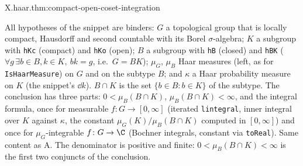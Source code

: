 \begin{tfformal}{X.haar.thm:compact-open-coset-integration}
\begin{tffidelity}
All hypotheses of the snippet are binders: $G$ a topological group that is locally compact, Hausdorff and second countable with its Borel $\sigma$-algebra; $K$ a subgroup with \texttt{hKc} (compact) and \texttt{hKo} (open); $B$ a subgroup with \texttt{hB} (closed) and \texttt{hBK} ($\forall g\,\exists b\in B,k\in K,\ bk=g$, i.e.\ $G=BK$); $\mu_G$, $\mu_B$ Haar measures (left, as for \texttt{IsHaarMeasure}) on $G$ and on the subtype $B$; and $\kappa$ a Haar probability measure on $K$ (the snippet's $\dd k$). $B\cap K$ is the set $\{b\in B:b\in K\}$ of the subtype. The conclusion has three parts: $0<\mu_B(B\cap K)$, $\mu_B(B\cap K)<\infty$, and the integral formula, once for measurable $f\colon G\to[0,\infty]$ (iterated \texttt{lintegral}, inner integral over $K$ against $\kappa$, the constant $\mu_G(K)/\mu_B(B\cap K)$ computed in $[0,\infty]$) and once for $\mu_G$-integrable $f\colon G\to\C$ (Bochner integrals, constant via \texttt{toReal}). Same content as A. The denominator is positive and finite: $0<\mu_B(B\cap K)<\infty$ is the first two conjuncts of the conclusion.
\end{tffidelity}
\end{tfformal}
